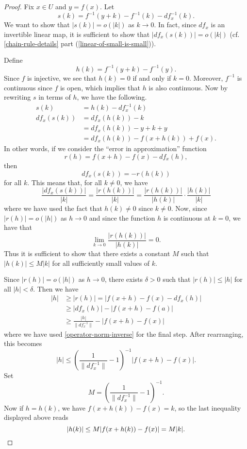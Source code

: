 \begin{proof}
	Fix $x \in U$ and $y = f(x)$. Let
	\[ s(k) = f^{-1}(y + k) - f^{-1}(k) - df_x^{-1}(k). \]
	We want to show that $|s(k)| = o(|k|)$ as $k \to 0$. In fact, since $df_x$ is an invertible linear map, it is sufficient to show that $|df_x(s(k))| = o(|k|)$ (cf. \cref{chain-rule-details} part  (\ref{linear-of-small-is-small})). 
	
	Define \[ h(k) = f^{-1}(y + k) - f^{-1}(y). \]
	Since $f$ is injective, we see that $h(k) = 0$ if and only if $k = 0$. Moreover, $f^{-1}$ is continuous since $f$ is open, which implies that $h$ is also continuous. Now by rewriting $s$ in terms of $h$, we have the following. 
	\[ \begin{aligned} 
	s(k) &= h(k) - df_x^{-1}(k) \\
	df_x(s(k)) &= df_x(h(k)) - k \\
	&= df_x(h(k)) - y + k + y \\
	&= df_x(h(k)) - f(x+h(k)) + f(x). \end{aligned} \]
	In other words, if we consider the ``error in approximation'' function
	\[ r(h) = f(x+h) - f(x) - df_x(h), \]
	then
	\[ df_x(s(k)) = -r(h(k)) \]
	for all $k$. This means that, for all $k \neq 0$, we have
	\[ \frac{|df_x(s(k))|}{|k|} = \frac{|r(h(k))|}{|k|} = \frac{|r(h(k))|}{|h(k)|} \cdot \frac{|h(k)|}{|k|} \]
	where we have used the fact that $h(k) \neq 0$ since $k \neq 0$. Now, since $|r(h)| = o(|h|)$ as $h \to 0$ and since the function $h$ is continuous at $k = 0$, we have that 
	\[ \lim_{k \to 0} \frac{|r(h(k))|}{|h(k)|} = 0. \]
	Thus it is sufficient to show that there exists a constant $M$ such that $|h(k)| \leq M|k|$ for all sufficiently small values of $k$.
	
	Since $|r(h)| = o(|h|)$ as $h \to 0$, there exists $\delta > 0$ such that $|r(h)| \leq |h|$ for all $|h| < \delta$. Then we have 
	\[ \begin{aligned} |h| &\geq |r(h)| = |f(x+h) - f(x) - df_x(h)| \\ &\geq |df_x(h)| - |f(x+h) - f(a)| \\
	&\geq \frac{|h|}{\|df_x^{-1}\|} - |f(x+h)-f(x)| \end{aligned} \]
	where we have used \cref{operator-norm-inverse} for the final step. After rearranging, this becomes
	\[ |h| \leq \left(\frac{1}{\|df_x^{-1}\|} - 1\right)^{-1} |f(x+h) - f(x)|. \] 
	Set
	\[ M = \left(\frac{1}{\|df_x^{-1}\|} - 1\right)^{-1}. \]
	Now if $h = h(k)$, we have $f(x+h(k)) - f(x) = k$, so the last inequality displayed above reads
	\[ |h(k)| \leq M |f(x+h(k)) - f(x)| = M|k|. \qedhere \]
\end{proof}

